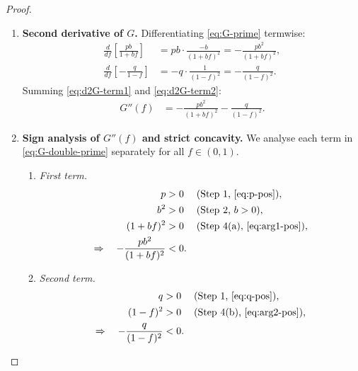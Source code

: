 \documentclass[12pt,openany]{book}
\numberwithin{equation}{chapter}
\theoremstyle{plain}
\theoremstyle{definition}
\theoremstyle{remark}
\numberwithin{equation}{chapter}
\theoremstyle{plain}
\begin{document}
\begin{proof}
\begin{enumerate}[label=\textbf{Step \arabic*.}, leftmargin=*, widest=Step 9]
  \item \textbf{Second derivative of $G$.}
        Differentiating \eqref{eq:G-prime} termwise:
        \begin{align}
          \frac{d}{df}\!\left[\frac{pb}{1+bf}\right]
            &= pb \cdot \frac{-b}{(1+bf)^{2}}
             = -\frac{pb^{2}}{(1+bf)^{2}},
               \label{eq:d2G-term1}\\[4pt]
          \frac{d}{df}\!\left[-\frac{q}{1-f}\right]
            &= -q \cdot \frac{1}{(1-f)^{2}}
             = -\frac{q}{(1-f)^{2}}.
               \label{eq:d2G-term2}
        \end{align}
        Summing \eqref{eq:d2G-term1} and \eqref{eq:d2G-term2}:
        \begin{align}
          G''(f) &= -\frac{pb^{2}}{(1+bf)^{2}}
                    -\frac{q}{(1-f)^{2}}.
                    \label{eq:G-double-prime}
        \end{align}

  \item \textbf{Sign analysis of $G''(f)$ and strict concavity.}
        We analyse each term in \eqref{eq:G-double-prime}
        separately for all $f \in (0,1)$.

        \begin{enumerate}[label=(\alph*)]
          \item \emph{First term.}
                \begin{align}
                  p          &> 0
                    && \text{(Step~1, \eqref{eq:p-pos})},
                    \label{eq:cc-p}\\
                  b^{2}      &> 0
                    && \text{(Step~2, } b>0\text{)},
                    \label{eq:cc-b2}\\
                  (1+bf)^{2} &> 0
                    && \text{(Step~4(a), \eqref{eq:arg1-pos})},
                    \label{eq:cc-denom1}\\
                  \Rightarrow\quad
                  -\frac{pb^{2}}{(1+bf)^{2}} &< 0.
                    \label{eq:cc-t1-neg}
                \end{align}

          \item \emph{Second term.}
                \begin{align}
                  q          &> 0
                    && \text{(Step~1, \eqref{eq:q-pos})},
                    \label{eq:cc-q}\\
                  (1-f)^{2}  &> 0
                    && \text{(Step~4(b), \eqref{eq:arg2-pos})},
                    \label{eq:cc-denom2}\\
                  \Rightarrow\quad
                  -\frac{q}{(1-f)^{2}} &< 0.
                    \label{eq:cc-t2-neg}
                \end{align}
        \end{enumerate}


\end{enumerate}
\end{proof}
\end{document}
